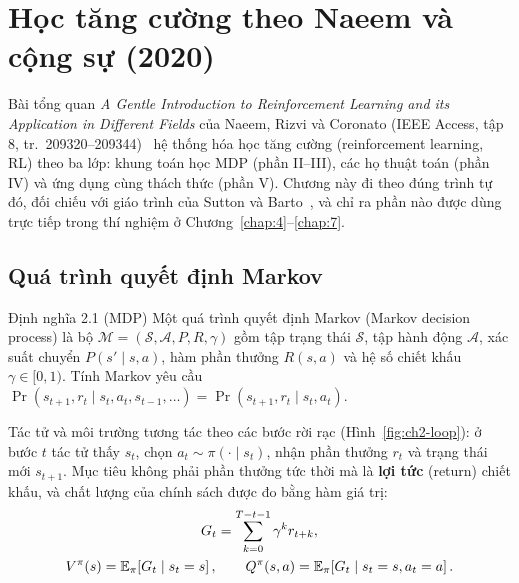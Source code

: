 \chapter{Học tăng cường theo Naeem và cộng sự (2020)}\label{chap:2}

Bài tổng quan \emph{A Gentle Introduction to Reinforcement Learning and its Application in Different Fields} của
Naeem, Rizvi và Coronato (IEEE Access, tập 8, tr.~209320--209344)~\cite{ch2:naeem} hệ thống hóa học tăng cường
(reinforcement learning, RL) theo ba lớp: khung toán học MDP (phần II--III), các họ thuật toán (phần IV) và ứng
dụng cùng thách thức (phần V). Chương này đi theo đúng trình tự đó, đối chiếu với giáo trình của Sutton và
Barto~\cite{ch2:sutton}, và chỉ ra phần nào được dùng trực tiếp trong thí nghiệm ở Chương~\ref{chap:4}--\ref{chap:7}.

\section{Quá trình quyết định Markov}

\begin{dinhnghia}{Định nghĩa 2.1 (MDP)}
Một quá trình quyết định Markov (Markov decision process) là bộ $\mathcal M=(\mathcal S,\mathcal A,P,R,\gamma)$
gồm tập trạng thái $\mathcal S$, tập hành động $\mathcal A$, xác suất chuyển $P(s'\mid s,a)$, hàm phần thưởng
$R(s,a)$ và hệ số chiết khấu $\gamma\in[0,1)$. Tính Markov yêu cầu
$\Pr(s_{t+1},r_t\mid s_t,a_t,s_{t-1},\dots)=\Pr(s_{t+1},r_t\mid s_t,a_t)$.
\end{dinhnghia}

Tác tử và môi trường tương tác theo các bước rời rạc (Hình~\ref{fig:ch2-loop}): ở bước $t$ tác tử thấy $s_t$, chọn
$a_t\sim\pi(\cdot\mid s_t)$, nhận phần thưởng $r_t$ và trạng thái mới $s_{t+1}$. Mục tiêu không phải phần thưởng
tức thời mà là \textbf{lợi tức} (return) chiết khấu, và chất lượng của chính sách được đo bằng hàm giá trị:
\begin{gather}
G_t=\sum_{k=0}^{T-t-1}\gamma^{k}r_{t+k},\label{eq:ch2-return}\\
V^{\pi}(s)=\mathbb E_{\pi}\!\left[G_t\mid s_t=s\right],\qquad
Q^{\pi}(s,a)=\mathbb E_{\pi}\!\left[G_t\mid s_t=s,a_t=a\right].\notag
\end{gather}



